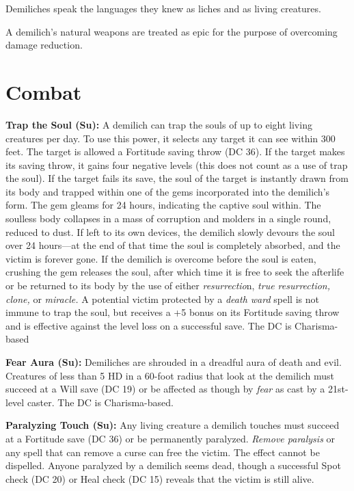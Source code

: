 \documentclass{article}
\begin{document}
Demiliches speak the languages they knew as liches and as living creatures. 

A demilich's natural weapons are treated as epic for the purpose of overcoming 
damage reduction.

\section*{Combat\textbf{ }}

\textbf{Trap the Soul (Su):} A demilich can trap the souls of up to eight living 
creatures per day. To use this power, it selects any target it can see within 300 
feet. The target is allowed a Fortitude saving throw (DC 36). If the target makes 
its saving throw, it gains four negative levels (this does not count as a use of 
trap the soul). If the target fails its save, the soul of the target is instantly 
drawn from its body and trapped within one of the gems incorporated into the demilich's 
form. The gem gleams for 24 hours, indicating the captive soul within. The soulless 
body collapses in a mass of corruption and molders in a single round, reduced to 
dust. If left to its own devices, the demilich slowly devours the soul over 24 
hours---at the end of that time the soul is completely absorbed, and the victim 
is forever gone. If the demilich is overcome before the soul is eaten, crushing 
the gem releases the soul, after which time it is free to seek the afterlife or 
be returned to its body by the use of either \textit{resurrectio}n, \textit{true 
resurrection, clone, }or \textit{miracle. }A potential victim protected by a \textit{death 
ward }spell is not immune to trap the soul, but receives a +5 bonus on its Fortitude 
saving throw and\textit{ }is effective against the level loss on a successful save. 
The DC is Charisma-based

\textbf{Fear Aura (Su):} Demiliches are shrouded in a dreadful aura of death and 
evil. Creatures of less than 5 HD in a 60-foot radius that look at the demilich 
must succeed at a Will save (DC 19) or be affected as though by \textit{fear }as 
cast by a 21st-level caster. The DC is Charisma-based.

\textbf{Paralyzing Touch (Su):} Any living creature a demilich touches must succeed 
at a Fortitude save (DC 36) or be permanently paralyzed. \textit{Remove paralysis 
}or any spell that can remove a curse can free the victim. The effect cannot be 
dispelled. Anyone paralyzed by a demilich seems dead, though a successful Spot 
check (DC 20) or Heal check (DC 15) reveals that the victim is still alive. 
\end{document}
